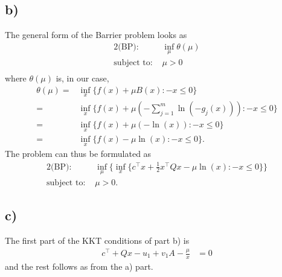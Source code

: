 \documentclass{article}
\begin{document}
\subsection*{b)}
	The general form of the Barrier problem looks as
	\begin{alignat}{2}
		\text{(BP): } & \inf_\mu \theta(\mu) \\
		\text{subject to: } & \mu > 0\\
	\end{alignat}
	where $\theta(\mu)$ is, in our case,
	\begin{align}
		\theta(\mu)=& \inf_x \{ f(x) + \mu B(x): -x \leq 0\}\\
		=& \inf_x \{ f(x) + \mu (-\sum_{j=1}^{m}\ln(-g_j(x))): -x \leq 0\} \\
		=& \inf_x \{ f(x) + \mu (-\ln(x)): -x \leq 0\} \\
		=& \inf_x \{ f(x) - \mu \ln(x): -x \leq 0\}.
	\end{align} 
	The problem can thus be formulated as
	\begin{alignat}{2}
		\text{(BP): } & \inf_\mu \{\inf_x \{ c^\top x + \frac{1}{2}x^\top Q x - \mu \ln(x): -x \leq 0\}\} \\
		\text{subject to: } & \mu > 0.
	\end{alignat}
\subsection*{c)}
	The first part of the KKT conditions of part b) is
	\begin{align}
		c^\top+Qx - u_1 + v_1A -\frac{\mu}{x} &= 0
	\end{align}
	and the rest follows as from the a) part.
	
\end{document}
